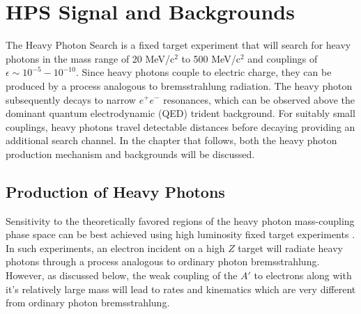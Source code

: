 
\chapter{HPS Signal and Backgrounds}

The Heavy Photon Search is a fixed target experiment that will search for heavy
photons in the mass range of 20 MeV/c$^{2}$ to 500 MeV/c$^{2}$ and couplings
of $\epsilon \sim 10^{-5} - 10^{-10}$.  Since heavy photons couple to electric
charge, they can be produced by a process analogous to bremsstrahlung 
radiation.  The heavy photon subsequently decays to narrow $e^+e^-$ resonances, 
which can be observed above the dominant quantum electrodynamic (QED) trident
background.  For suitably small couplings, heavy photons travel detectable 
distances before decaying providing an additional search channel.  In the 
chapter that follows, both the heavy photon production mechanism and backgrounds
will be discussed.

\section{Production of Heavy Photons}

Sensitivity to the theoretically favored regions of the heavy photon 
mass-coupling phase space can be best achieved using high luminosity fixed
target experiments \cite{Bjorken2009}.  In such experiments, an electron
incident on a high $Z$ target will radiate heavy photons 
through a process analogous to ordinary photon bremsstrahlung. 
%
%
However, as discussed below, the weak coupling
of the $A'$ to electrons along with it's relatively large mass will lead to 
rates and kinematics which are very different from ordinary photon 
bremsstrahlung.


